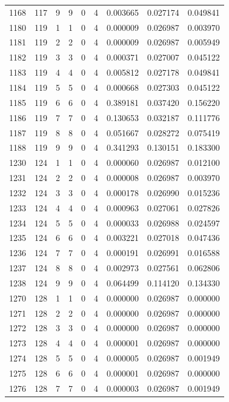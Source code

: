 \begin{longtable}{rrrrrrrrr}
1168 & 117 & 9 & 9 & 0 & 4 & 0.003665 & 0.027174 & 0.049841 \\
1180 & 119 & 1 & 1 & 0 & 4 & 0.000009 & 0.026987 & 0.003970 \\
1181 & 119 & 2 & 2 & 0 & 4 & 0.000009 & 0.026987 & 0.005949 \\
1182 & 119 & 3 & 3 & 0 & 4 & 0.000371 & 0.027007 & 0.045122 \\
1183 & 119 & 4 & 4 & 0 & 4 & 0.005812 & 0.027178 & 0.049841 \\
1184 & 119 & 5 & 5 & 0 & 4 & 0.000668 & 0.027303 & 0.045122 \\
1185 & 119 & 6 & 6 & 0 & 4 & 0.389181 & 0.037420 & 0.156220 \\
1186 & 119 & 7 & 7 & 0 & 4 & 0.130653 & 0.032187 & 0.111776 \\
1187 & 119 & 8 & 8 & 0 & 4 & 0.051667 & 0.028272 & 0.075419 \\
1188 & 119 & 9 & 9 & 0 & 4 & 0.341293 & 0.130151 & 0.183300 \\
1230 & 124 & 1 & 1 & 0 & 4 & 0.000060 & 0.026987 & 0.012100 \\
1231 & 124 & 2 & 2 & 0 & 4 & 0.000008 & 0.026987 & 0.003970 \\
1232 & 124 & 3 & 3 & 0 & 4 & 0.000178 & 0.026990 & 0.015236 \\
1233 & 124 & 4 & 4 & 0 & 4 & 0.000963 & 0.027061 & 0.027826 \\
1234 & 124 & 5 & 5 & 0 & 4 & 0.000033 & 0.026988 & 0.024597 \\
1235 & 124 & 6 & 6 & 0 & 4 & 0.003221 & 0.027018 & 0.047436 \\
1236 & 124 & 7 & 7 & 0 & 4 & 0.000191 & 0.026991 & 0.016588 \\
1237 & 124 & 8 & 8 & 0 & 4 & 0.002973 & 0.027561 & 0.062806 \\
1238 & 124 & 9 & 9 & 0 & 4 & 0.064499 & 0.114120 & 0.134330 \\
1270 & 128 & 1 & 1 & 0 & 4 & 0.000000 & 0.026987 & 0.000000 \\
1271 & 128 & 2 & 2 & 0 & 4 & 0.000000 & 0.026987 & 0.000000 \\
1272 & 128 & 3 & 3 & 0 & 4 & 0.000000 & 0.026987 & 0.000000 \\
1273 & 128 & 4 & 4 & 0 & 4 & 0.000001 & 0.026987 & 0.000000 \\
1274 & 128 & 5 & 5 & 0 & 4 & 0.000005 & 0.026987 & 0.001949 \\
1275 & 128 & 6 & 6 & 0 & 4 & 0.000001 & 0.026987 & 0.000000 \\
1276 & 128 & 7 & 7 & 0 & 4 & 0.000003 & 0.026987 & 0.001949 \\

\end{longtable}
